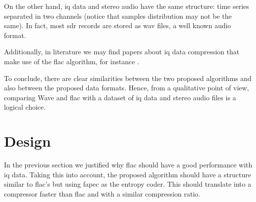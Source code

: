 On the other hand, \acrshort{iq} data and stereo audio have the same structure: time series separated in two channels (notice that samples distribution may not be the same). In fact, most \acrshort{sdr} records are stored as \acrshort{wav} files, a well known audio format.

Additionally, in literature we may find papers about \acrshort{iq} data compression that make use of the \acrshort{flac} algorithm, for instance \parencite{IQFlac}.

To conclude, there are clear similarities between the two proposed algorithms and also between the proposed data formats. Hence, from a qualitative point of view, comparing Wave and \acrshort{flac} with a dataset of \acrshort{iq} data and stereo audio files is a logical choice.

\section{Design}

In the previous section we justified why \acrshort{flac} should have a good performance with \acrshort{iq} data. Taking this into account, the proposed algorithm should have a structure similar to \acrshort{flac}'s but using \acrshort{fapec} as the entropy coder. This should translate into a compressor faster than \acrshort{flac} and with a similar compression ratio.

